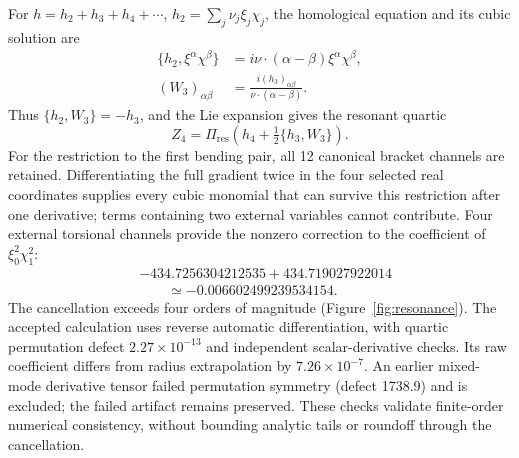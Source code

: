 For $h=h_2+h_3+h_4+\cdots$, $h_2=\sum_j\nu_j\xi_j\chi_j$, the homological equation and its cubic solution are
\begin{equation}
 \begin{aligned}
 \{h_2,\xi^\alpha\chi^\beta\}
 &=i\nu\cdot(\alpha-\beta)\xi^\alpha\chi^\beta,\\
 (W_3)_{\alpha\beta}&=\frac{i(h_3)_{\alpha\beta}}{\nu\cdot(\alpha-\beta)}.
 \end{aligned}
 \label{eq:learn-homological}
\end{equation}
Thus $\{h_2,W_3\}=-h_3$, and the Lie expansion gives the resonant quartic
\begin{equation}
 Z_4=\Pi_{\mathrm{res}}\left(h_4+\tfrac12\{h_3,W_3\}\right).
 \label{eq:learn-resonant-quartic}
\end{equation}
For the restriction to the first bending pair, all 12 canonical bracket channels are retained. Differentiating the full gradient twice in the four selected real coordinates supplies every cubic monomial that can survive this restriction after one derivative; terms containing two external variables cannot contribute. Four external torsional channels provide the nonzero correction to the coefficient of $\xi_0^2\chi_1^2$:
\begin{equation}
 \begin{aligned}
 &-434.7256304212535+434.719027922014\\
 &\qquad\simeq-0.006602499239534154.
 \end{aligned}
 \label{eq:learn-cancellation}
\end{equation}
The cancellation exceeds four orders of magnitude (Figure~\ref{fig:resonance}). The accepted calculation uses reverse automatic differentiation, with quartic permutation defect $2.27\times10^{-13}$ and independent scalar-derivative checks. Its raw coefficient differs from radius extrapolation by $7.26\times10^{-7}$. An earlier mixed-mode derivative tensor failed permutation symmetry (defect 1738.9) and is excluded; the failed artifact remains preserved. These checks validate finite-order numerical consistency, without bounding analytic tails or roundoff through the cancellation.

